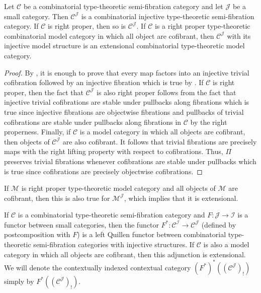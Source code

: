 \documentclass[reqno]{amsart}
\theoremstyle{definition}
\theoremstyle{remark}
\newcommand{\scat}[1]{\mathcal{#1}}
\numberwithin{figure}{section}
\begin{document}
\begin{cor}
Let $\scat{C}$ be a combinatorial type-theoretic semi-fibration category and let $\scat{J}$ be a small category.
Then $\scat{C}^\scat{J}$ is a combinatorial injective type-theoretic semi-fibration category.
If $\scat{C}$ is right proper, then so is $\scat{C}^\scat{J}$.
If $\scat{C}$ is a right proper type-theoretic combinatorial model category in which all object are cofibrant, then $\scat{C}^\scat{J}$ with its injective model structure is an extensional combinatorial type-theoretic model category.
\end{cor}
\begin{proof}
By , it is enough to prove that every map factors into an injective trivial cofibration followed by an injective fibration which is true by \cite[Lemma~A.2.8.3]{lurie-topos}.
If $\scat{C}$ is right proper, then the fact that $\scat{C}^\scat{J}$ is also right proper follows from the fact that injective trivial cofibrations are stable under pullbacks along fibrations which is true since injective fibrations are objectwise fibrations and pullbacks of trivial cofibrations are stable under pullbacks along fibrations in $\scat{C}$ by the right properness.
Finally, if $\scat{C}$ is a model category in which all objects are cofibrant, then objects of $\scat{C}^\scat{J}$ are also cofibrant.
It follows that trivial fibrations are precisely maps with the right lifting property with respect to cofibrations.
Thus, $\Pi$ preserves trivial fibrations whenever cofibrations are stable under pullbacks which is true since cofibrations are precisely objectwise cofibrations.
\end{proof}

\begin{example}
If $\scat{M}$ is right proper type-theoretic model category and all objects of $\scat{M}$ are cofibrant, then this is also true for $\scat{M}^\scat{J}$, which implies that it is extensional.
\end{example}

\begin{example}
If $\scat{C}$ is a combinatorial type-theoretic semi-fibration category and $F : \scat{J} \to \scat{I}$ is a functor between small categories,
then the functor $F^* : \scat{C}^\scat{I} \to \scat{C}^\scat{J}$ (defined by postcomposition with $F$) is a left Quillen functor between combinatorial type-theoretic semi-fibration categories with injective structures.
If $\scat{C}$ is also a model category in which all objects are cofibrant, then this adjunction is extensional.
We will denote the contextually indexed contextual category $(F^*)^*((\scat{C}^\scat{J})_!)$ simply by $F^*((\scat{C}^\scat{J})_!)$.
\end{example}
\end{document}
